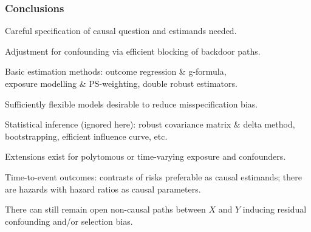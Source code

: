 \documentclass[12pt,dvipsnames,t,aspectratio=169, handout%
]{beamer}
\begin{document}
\begin{frame}
\frametitle{\large Conclusions}

\bi
\item 
Careful specification of causal question and estimands needed.
\pause
\medskip
\item 
Adjustment for confounding via efficient blocking of backdoor paths.
\pause
\medskip
\item
Basic estimation methods: outcome regression \& g-formula, \\ 
exposure modelling \& PS-weighting, double robust estimators.
\pause 
\medskip
\item
Sufficiently flexible models desirable to reduce misspecification bias.
\pause
\medskip
\item 
Statistical inference (ignored here): robust covariance matrix \& delta method, bootstrapping,
efficient influence curve, etc.  
\pause
\medskip
\item
Extensions exist for
 polytomous or time-varying exposure and confounders.
 \pause
 \medskip
\item
Time-to-event outcomes: contrasts of risks preferable as causal estimands; 
there are hazards with hazard ratios as causal parameters.  
\pause
\medskip
 \item
There can still remain open non-causal paths between $X$ and $Y$ 
inducing residual confounding and/or selection bias.
\ei

\end{frame}
\end{document}
